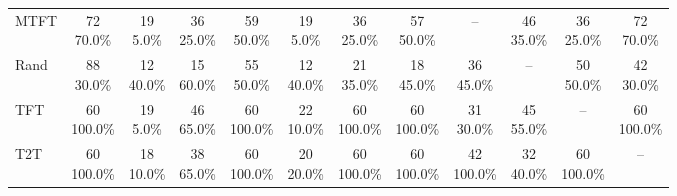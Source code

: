 \documentclass[11pt]{article}
\begin{document}
\begin{table}[H]
{\begin{tabular}{lccccccccccc}
MTFT & \shortstack{72\\70.0\%} & \shortstack{19\\5.0\%} & \shortstack{36\\25.0\%} & \shortstack{59\\50.0\%} & \shortstack{19\\5.0\%} & \shortstack{36\\25.0\%} & \shortstack{57\\50.0\%} & -- & \shortstack{46\\35.0\%} & \shortstack{36\\25.0\%} & \shortstack{72\\70.0\%} \\
Rand & \shortstack{88\\30.0\%} & \shortstack{12\\40.0\%} & \shortstack{15\\60.0\%} & \shortstack{55\\50.0\%} & \shortstack{12\\40.0\%} & \shortstack{21\\35.0\%} & \shortstack{18\\45.0\%} & \shortstack{36\\45.0\%} & -- & \shortstack{50\\50.0\%} & \shortstack{42\\30.0\%} \\
TFT & \shortstack{60\\100.0\%} & \shortstack{19\\5.0\%} & \shortstack{46\\65.0\%} & \shortstack{60\\100.0\%} & \shortstack{22\\10.0\%} & \shortstack{60\\100.0\%} & \shortstack{60\\100.0\%} & \shortstack{31\\30.0\%} & \shortstack{45\\55.0\%} & -- & \shortstack{60\\100.0\%} \\
T2T & \shortstack{60\\100.0\%} & \shortstack{18\\10.0\%} & \shortstack{38\\65.0\%} & \shortstack{60\\100.0\%} & \shortstack{20\\20.0\%} & \shortstack{60\\100.0\%} & \shortstack{60\\100.0\%} & \shortstack{42\\100.0\%} & \shortstack{32\\40.0\%} & \shortstack{60\\100.0\%} & -- \\
\bottomrule
\end{tabular}%
}
\endgroup


\end{table}
\end{document}
